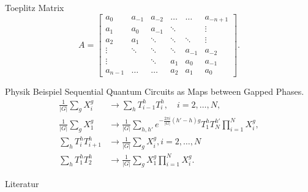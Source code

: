 \documentclass{beamer}
\begin{document}
\begin{frame}
    Toeplitz Matrix
    \[ A=\begin{bmatrix}
            a_0 & a_{-1} & a_{-2} & \ldots & \ldots  &a_{-n+1}  \\
            a_1 & a_0  & a_{-1} &  \ddots   &  &  \vdots \\
            a_2 & a_1 & \ddots  & \ddots & \ddots& \vdots \\ 
            \vdots &  \ddots & \ddots &   \ddots  & a_{-1} & a_{-2}\\
            \vdots &         & \ddots & a_1 & a_0 &  a_{-1} \\
            a_{n-1} &  \ldots & \ldots & a_2 & a_1 & a_0
        \end{bmatrix} .\] 
\end{frame}



\begin{frame}{Physik Beispiel}
    Sequential Quantum Circuits as Maps between Gapped Phases.\cite{chen2023sequential}
    \begin{align*}
        \frac{1}{|G|}\sum_g X^g_i &\to \sum_h T^h_{i-1}T^h_i, \quad i=2,\ldots,N,  \\
        \frac{1}{|G|} \sum_g X_1^g &\to \frac{1}{|G|} \sum_{h,h'}e^{-\frac{2\pi i}{|G|}(h'-h)g}T_1^hT^{h'}_N \prod^N_{i=1}X_i^g,  \\
        \sum_h T^h_i T^h_{i+1} &\to \frac{1}{|G|} \sum_g X_i^g, i=2,\ldots,N  \\
        \sum_h T^h_1 T^h_2 &\to \frac{1}{|G|} \sum_g X_1^g \prod_{i=1}^N X_i^g.
    \end{align*}
\end{frame}












\begin{frame}{Literatur}
    \printbibliography
    
\end{frame}




\end{document}
